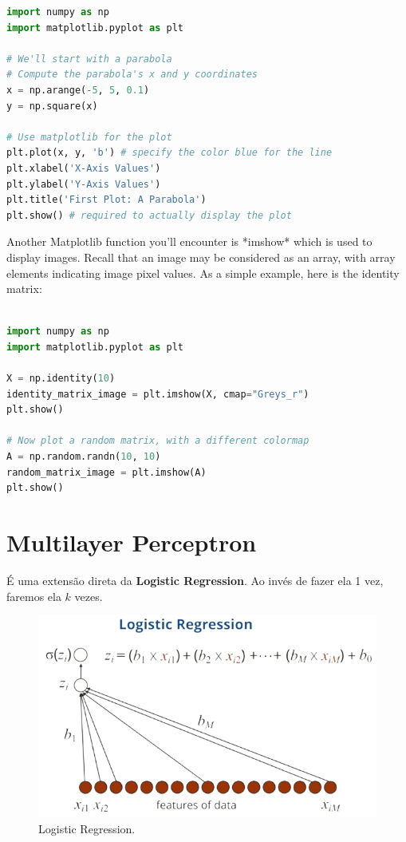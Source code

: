 \documentclass[11pt, a4paper]{article}
\begin{document}
\begin{lstlisting}[language=Python, caption=MatPlotLib.PyPlot]
import numpy as np
import matplotlib.pyplot as plt

# We'll start with a parabola
# Compute the parabola's x and y coordinates
x = np.arange(-5, 5, 0.1)
y = np.square(x)

# Use matplotlib for the plot
plt.plot(x, y, 'b') # specify the color blue for the line
plt.xlabel('X-Axis Values')
plt.ylabel('Y-Axis Values')
plt.title('First Plot: A Parabola')
plt.show() # required to actually display the plot
\end{lstlisting}

Another Matplotlib function you'll encounter is *imshow* which is used to display images. Recall that an image may be considered as an array, with array elements indicating image pixel values. As a simple example, here is the identity matrix:


\begin{lstlisting}[language=Python]

import numpy as np
import matplotlib.pyplot as plt

X = np.identity(10)
identity_matrix_image = plt.imshow(X, cmap="Greys_r")
plt.show()

# Now plot a random matrix, with a different colormap
A = np.random.randn(10, 10)
random_matrix_image = plt.imshow(A)
plt.show()
\end{lstlisting}

\pagebreak
\section{Multilayer Perceptron}

É uma extensão direta da \textbf{Logistic Regression}. Ao invés de fazer ela 1 vez, faremos ela $k$ vezes.

\begin{figure}[h]
\centering
\includegraphics[scale=0.3]{1stMTP}
\caption{Logistic Regression.}
\end{figure}
\end{document}
